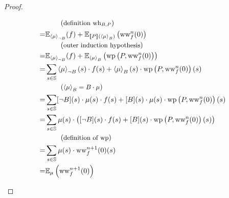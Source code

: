 \begin{theorem}
\begin{proof}
\begin{description}
\begin{align*}
				  & \explain{definition $\wh$} \\
				= & \E_{ \resN{\mu} } (f)
					+ \E_{ \smtx{P}(\resP{\mu}) } \l( \ww^n(0) \r) \\
				  & \explain{outer induction hypothesis} \\
				= & \E_{ \resN{\mu} } (f)
					+ \E_{\resP{\mu}} \l( \wp{P, \ww^n (0)} \r) \\
				= & \sum_{s \in \S}  \resN{\mu}(s) \cdot f(s)
					+ \resP{\mu}(s) \cdot \wp{P, \ww^n (0)}(s) \\
				 & \explain{$\resP{\mu} = B \cdot \mu$} \\
				= & \sum_{s \in \S} [\lnot B](s) \cdot \mu(s) \cdot f(s)
					+ [B](s) \cdot \mu(s) \cdot \wp{P, \ww^n (0)}(s) \\
				= & \sum_{s \in \S} \mu(s) \cdot \l( [\lnot B](s) \cdot f(s) + [B](s) \cdot \wp{P, \ww^n (0)}(s) \r) \\
				  & \explain{definition of $\operatorname{wp}$} \\
				= & \sum_{s \in \S} \mu(s) \cdot \ww^{n+1} (0)(s) \\
				= & \E_\mu \l( \ww^{n+1}(0) \r)			\qedhere
			\end{align*}
		\end{description}
	\end{proof}
\end{theorem}